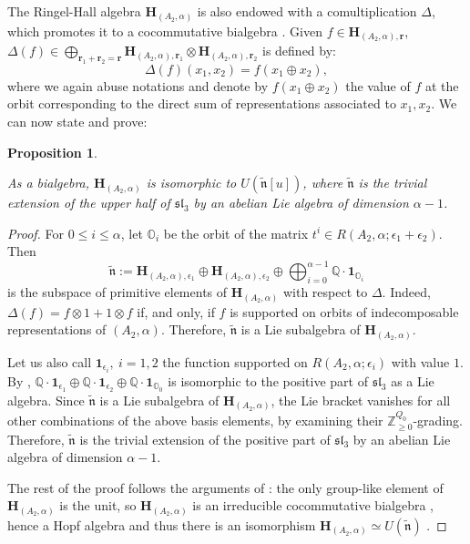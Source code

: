 \documentclass[11pt,english]{article}
\numberwithin{equation}{section}
\numberwithin{figure}{section}
\theoremstyle{definition}
\theoremstyle{plain}
\newtheorem{prop}[df]{Proposition}
\theoremstyle{remark}
\newcommand\rr{\mathbf{r}}
\newcommand\ZZ{\mathbb{Z}}
\newcommand\QQ{\mathbb{Q}}
\begin{document}
The Ringel-Hall algebra $\mathbf{H}_{(A_{2},\alpha)}$ is also endowed
with a comultiplication $\Delta$, which promotes it to a cocommutative
bialgebra \cite[Prop. 4.5.]{GLS16}. Given $f\in\mathbf{H}_{(A_{2},\alpha),\rr}$,
$\Delta(f)\in\bigoplus_{\rr_{1}+\rr_{2}=\rr}\mathbf{H}_{(A_{2},\alpha),\rr_{1}}\otimes\mathbf{H}_{(A_{2},\alpha),\rr_{2}}$
is defined by:\[
\Delta(f)(x_1,x_2)=f(x_1\oplus x_2),
\]where we again abuse notations and denote by $f(x_{1}\oplus x_{2})$
the value of $f$ at the orbit corresponding to the direct sum of
representations associated to $x_{1},x_{2}$. We can now state and
prove:

\begin{prop} \label{Prop/RingelHallA2mult}

As a bialgebra, $\mathbf{H}_{(A_{2},\alpha)}$ is isomorphic to $U(\tilde{\mathfrak{n}}[u])$,
where $\tilde{\mathfrak{n}}$ is the trivial extension of the upper
half of $\mathfrak{sl}_{3}$ by an abelian Lie algebra of dimension
$\alpha-1$.

\end{prop}

\begin{proof}

For $0\leq i\leq\alpha$, let $\mathbb{O}_{i}$ be the orbit of the
matrix $t^{i}\in R(A_{2},\alpha;\epsilon_{1}+\epsilon_{2})$. Then
\[
\tilde{\mathfrak{n}}:=\mathbf{H}_{(A_{2},\alpha),\epsilon_1}\oplus\mathbf{H}_{(A_{2},\alpha),\epsilon_2}\oplus\bigoplus_{i=0}^{\alpha-1}\QQ\cdot\mathbf{1}_{\mathbb{O}_{i}}
\] is the subspace of primitive elements of $\mathbf{H}_{(A_{2},\alpha)}$
with respect to $\Delta$. Indeed, $\Delta(f)=f\otimes1+1\otimes f$
if, and only, if $f$ is supported on orbits of indecomposable representations
of $(A_{2},\alpha)$. Therefore, $\tilde{\mathfrak{n}}$ is a Lie
subalgebra of $\mathbf{H}_{(A_{2},\alpha)}$.

Let us also call $\mathbf{1}_{\epsilon_{i}},\ i=1,2$ the function
supported on $R(A_{2},\alpha;\epsilon_{i})$ with value $1$. By \cite[Prop. 4.9.]{GLS16},
$\QQ\cdot\mathbf{1}_{\epsilon_{1}}\oplus\QQ\cdot\mathbf{1}_{\epsilon_{2}}\oplus\QQ\cdot\mathbf{1}_{\mathbb{O}_{0}}$
is isomorphic to the positive part of $\mathfrak{sl}_{3}$ as a Lie
algebra. Since $\tilde{\mathfrak{n}}$ is a Lie subalgebra of $\mathbf{H}_{(A_{2},\alpha)}$,
the Lie bracket vanishes for all other combinations of the above basis
elements, by examining their $\ZZ_{\geq0}^{Q_{0}}$-grading. Therefore,
$\tilde{\mathfrak{n}}$ is the trivial extension of the positive part
of $\mathfrak{sl}_{3}$ by an abelian Lie algebra of dimension $\alpha-1$.

The rest of the proof follows the arguments of \cite[Prop. 4.7.]{GLS16}:
the only group-like element of $\mathbf{H}_{(A_{2},\alpha)}$ is the
unit, so $\mathbf{H}_{(A_{2},\alpha)}$ is an irreducible cocommutative
bialgebra \cite[Lem. 8.0.1.]{Swe69}, hence a Hopf algebra \cite[Thm. 9.2.2.]{Swe69}
and thus there is an isomorphism $\mathbf{H}_{(A_{2},\alpha)}\simeq U(\tilde{\mathfrak{n}})$
\cite[Thm. 13.0.1.]{Swe69}. \end{proof}
\end{document}
